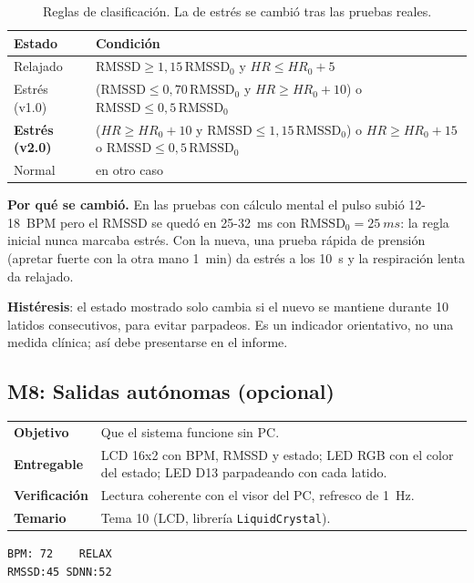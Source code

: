 \documentclass[11pt,a4paper]{article}
\newcommand{\modinfo}[4]{%
  \begin{center}\small
  \renewcommand{\arraystretch}{1.25}
  \begin{tabularx}{\textwidth}{>{\bfseries\color{navy}}lX}
  \toprule
  Objetivo     & #1 \\
  Entregable   & #2 \\
  Verificación & #3 \\
  Temario      & #4 \\
  \bottomrule
  \end{tabularx}
  \end{center}}
\begin{document}
\begin{table}[H]
\centering\small
\caption{Reglas de clasificación. La de estrés se cambió tras las pruebas reales.}
\label{tab:estado}
\begin{tabularx}{\textwidth}{lX}
\toprule
Estado & Condición \\
\midrule
Relajado & $\mathrm{RMSSD} \ge 1{,}15\,\mathrm{RMSSD}_0$ y $HR \le HR_0 + 5$ \\
Estrés (v1.0) & ($\mathrm{RMSSD} \le 0{,}70\,\mathrm{RMSSD}_0$ y $HR \ge HR_0 + 10$) o $\mathrm{RMSSD} \le 0{,}5\,\mathrm{RMSSD}_0$ \\
\textbf{Estrés (v2.0)} & ($HR \ge HR_0 + 10$ y $\mathrm{RMSSD} \le 1{,}15\,\mathrm{RMSSD}_0$) o $HR \ge HR_0 + 15$ o $\mathrm{RMSSD} \le 0{,}5\,\mathrm{RMSSD}_0$ \\
Normal   & en otro caso \\
\bottomrule
\end{tabularx}
\end{table}

\textbf{Por qué se cambió.} En las pruebas con cálculo mental el pulso subió 12-\qty{18}{BPM}
pero el RMSSD se quedó en 25-\qty{32}{ms} con $\mathrm{RMSSD}_0 = \qty{25}{ms}$: la regla
inicial nunca marcaba estrés. Con la nueva, una prueba rápida de prensión (apretar fuerte con
la otra mano \qty{1}{min}) da estrés a los \qty{10}{s} y la respiración lenta da relajado.

\textbf{Histéresis}: el estado mostrado solo cambia si el nuevo se mantiene durante 10
latidos consecutivos, para evitar parpadeos. Es un indicador orientativo, no una medida
clínica; así debe presentarse en el informe.

\subsection{M8: Salidas autónomas (opcional)}

\modinfo{Que el sistema funcione sin PC.}
{LCD 16x2 con BPM, RMSSD y estado; LED RGB con el color del estado; LED D13 parpadeando
con cada latido.}
{Lectura coherente con el visor del PC, refresco de \qty{1}{Hz}.}
{Tema 10 (LCD, librería \texttt{LiquidCrystal}).}

\begin{center}\small
\texttt{BPM: 72\ \ \ \ RELAX}\\
\texttt{RMSSD:45 SDNN:52}
\end{center}
\end{document}

